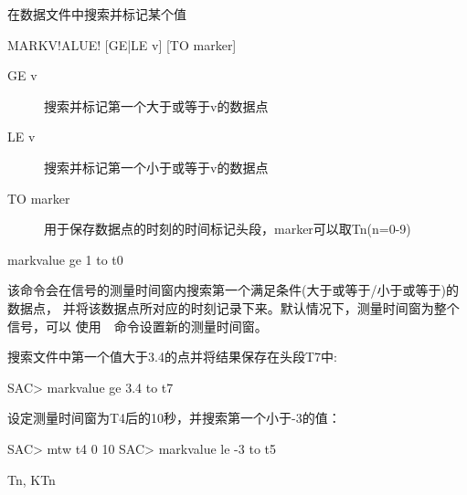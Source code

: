 \label{cmd:markvalue}

在数据文件中搜索并标记某个值

\begin{SACSTX}
MARKV!ALUE! [GE|LE v] [TO marker]
\end{SACSTX}

\begin{description}
\item [GE v] 搜索并标记第一个大于或等于v的数据点
\item [LE v] 搜索并标记第一个小于或等于v的数据点
\item [TO marker] 用于保存数据点的时刻的时间标记头段，marker可以取Tn(n=0-9)
\end{description}

\begin{SACDFT}
markvalue ge 1 to t0
\end{SACDFT}

该命令会在信号的测量时间窗内搜索第一个满足条件(大于或等于/小于或等于)的数据点，
并将该数据点所对应的时刻记录下来。默认情况下，测量时间窗为整个信号，可以
使用~~命令设置新的测量时间窗。

搜索文件中第一个值大于3.4的点并将结果保存在头段T7中:
\begin{SACCode}
SAC> markvalue ge 3.4 to t7
\end{SACCode}

设定测量时间窗为T4后的10秒，并搜索第一个小于-3的值：
\begin{SACCode}
SAC> mtw t4 0 10
SAC> markvalue le -3 to t5
\end{SACCode}

Tn, KTn

